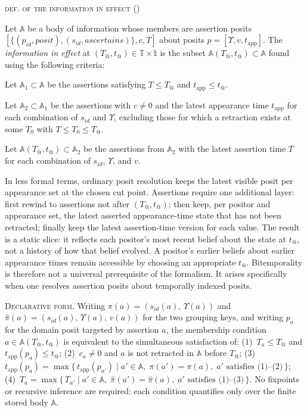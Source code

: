 \documentclass[a4paper,fleqn]{cas-sc}
\newcounter{majorcount}
\newcommand{\deffy}[3]{
	\vspace{2ex}
	\refstepcounter{majorcount}
	\noindent\textsc{#1} {\normalfont(\arabic{majorcount})}
	\\\begin{small}
	\noindent #2%
	\label{Def:#3}
	\end{small}
	\vspace{2ex}
}
\begin{document}
\deffy{def. of the information in effect}{%
Let \(\mathbb{A}\) be a body of information whose members are assertion posits
\(\left[\{(p_{id}, \textit{posit}), (s_{id}, \textit{ascertains})\}, c, T\right]\)
about posits \(p = [\Upsilon, v, t_{\mathrm{app}}]\). The \emph{information in effect} at \((T_@, t_@) \in \mathbb{T} \times \mathbb{t}\) is the subset
\(\mathbb{A}(T_@, t_@) \subset \mathbb{A}\)
found using the following criteria:
\begin{criteria}
\item Let \(\mathbb{A}_1 \subset \mathbb{A}\) be the assertions satisfying \(T \leq T_@\) and \(t_{\mathrm{app}} \leq t_@\).
\item Let \(\mathbb{A}_2 \subset \mathbb{A}_1\) be the assertions with \(c \neq 0\) and the latest appearance time \(t_{\mathrm{app}}\) for each combination of \(s_{id}\) and \(\Upsilon\), excluding those for which a retraction exists at some \(T_0\) with \(T \leq T_0 \leq T_@\).
\item Let \(\mathbb{A}(T_@, t_@) \subset \mathbb{A}_2\) be the assertions from \(\mathbb{A}_2\) with the latest assertion time \(T\) for each combination of \(s_{id}\), \(\Upsilon\), and \(v\).
\end{criteria}}{effect}

In less formal terms, ordinary posit resolution keeps the latest visible posit per appearance set at the chosen cut point. Assertions require one additional layer: first rewind to assertions not after \((T_@, t_@)\); then keep, per positor and appearance set, the latest asserted appearance-time state that has not been retracted; finally keep the latest assertion-time version for each value. The result is a static slice: it reflects each positor's most recent belief about the state at \(t_@\), not a history of how that belief evolved. A positor's earlier beliefs about earlier appearance times remain accessible by choosing an appropriate \(t_@\). Bitemporality is therefore not a universal prerequisite of the formalism. It arises specifically when one resolves assertion posits about temporally indexed posits.

\textsc{Declarative form.} Writing \(\pi(a) = (s_{id}(a),\,\Upsilon(a))\) and \(\hat\pi(a) = (s_{id}(a),\,\Upsilon(a),\,v(a))\) for the two grouping keys, and writing \(p_a\) for the domain posit targeted by assertion \(a\), the membership condition \(a \in \mathbb{A}(T_@, t_@)\) is equivalent to the simultaneous satisfaction of: (1)~\(T_a \leq T_@\) and \(t_{\mathrm{app}}(p_a) \leq t_@\); (2)~\(c_a \neq 0\) and \(a\) is not retracted in \(\mathbb{A}\) before \(T_@\); (3)~\(t_{\mathrm{app}}(p_a) = \max\{\,t_{\mathrm{app}}(p_{a'}) \mid a' \in \mathbb{A},\;\pi(a')=\pi(a),\; a'\text{ satisfies (1)--(2)}\,\}\); (4)~\(T_a = \max\{\,T_{a'} \mid a' \in \mathbb{A},\;\hat\pi(a')=\hat\pi(a),\; a'\text{ satisfies (1)--(3)}\,\}\). No fixpoints or recursive inference are required: each condition quantifies only over the finite stored body \(\mathbb{A}\).
\end{document}
